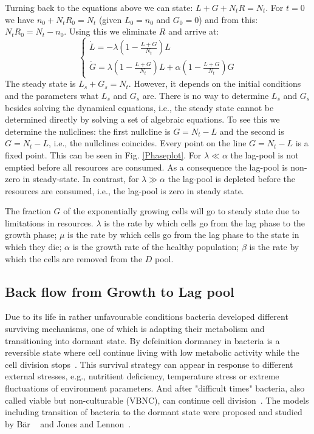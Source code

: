 \documentclass[10pt,A4paper]{article}
\begin{document}
Turning back to the equations above we can state: $L+G+N_tR=N_t$. For $t=0$ we have $n_0+N_tR_0=N_t$ (given $L_0=n_0$ and $G_0=0$) and from this: $N_tR_0=N_t-n_0$. Using this we eliminate $R$ and arrive at: 
\begin{equation}
    \begin{cases}
        \dot{L} = - \lambda \left(1-\frac{L+G}{N_t}\right)L\\
        \dot{G} = \lambda \left(1-\frac{L+G}{N_t}\right)L +\alpha \left(1-\frac{L+G}{N_t}\right) G
\end{cases}
\end{equation}
The steady state is $L_s+G_s=N_t$. However, it depends on the initial conditions and the parameters what $L_s$ and $G_s$ are. There is no way to determine $L_s$ and $G_s$ besides solving the dynamical equations, i.e., the steady state cannot be determined directly by solving a set of algebraic equations. To see this we determine the nullclines: the first nullcline is $G=N_t-L$ and the second is $G=N_t-L$, i.e., the nullclines coincides. Every point on the line $G=N_t-L$ is a fixed point. 
This can be seen in Fig. \ref{Phaseplot}. 
For $\lambda\ll \alpha$ the lag-pool is not emptied before all resources are consumed. As a consequence the lag-pool is non-zero in steady-state. 
In contrast, for $\lambda\gg \alpha$ the lag-pool is depleted before the resources are consumed, i.e., the lag-pool is zero in steady state.

The fraction $G$ of the exponentially growing cells will go to steady state due to limitations in resources. 
$\lambda$ is the rate by which cells go from the lag phase to the growth phase; $\mu$ is the rate by which cells go from the lag phase to the state in which they die; $\alpha$ is the growth rate of the healthy population; $\beta$ is the rate by which the cells are removed from the $D$ pool. 


\subsection{Back flow from Growth to Lag pool}

Due to its life in rather unfavourable conditions bacteria developed different surviving mechanisms, one of which is adapting their metabolism and transitioning into dormant state.
By defeinition dormancy in bacteria is a reversible state where cell continue living with low metabolic activity while the cell division stops~\cite{kaprelyants_dormancy_1993}. 
This survival strategy can appear in response to different external stresses, e.g., nutritient deficiency, temperature stress or extreme fluctuations of environment parameters.
And after "difficult times" bacteria, also called viable but non-culturable (VBNC), can continue cell division~\cite{kell_viability_1998}.
The models including transition of bacteria to the dormant state were proposed and studied by Bär \etal~\cite{bar_modelling_2002} and Jones and Lennon~\cite{jones_dormancy_2010}.
\end{document}
